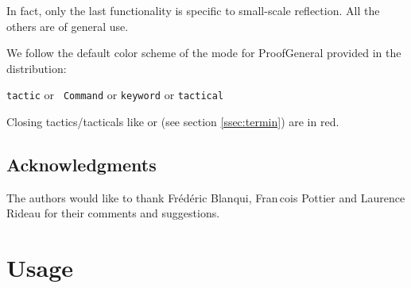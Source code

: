 In fact, only the last functionality is specific to small-scale
reflection. All the others are of general use.

\iffalse
\subsection*{How to read this documentation}

The syntax of the tactics is presented as follows:
\begin{itemize}
\item \ssrC{terminals} are in typewriter font and \ssrN{non terminals} are
  between angle brackets.
\item Optional parts of the grammar are surrounded by \optional{ }
  brackets. These should not be confused with verbatim brackets
  \ssrC{[ ]}, which are delimiters in the \ssr{} syntax.
\item A vertical rule {\optsep} indicates an alternative in the syntax, and
  should not be confused with a
  verbatim vertical rule between verbatim brackets \ssrC{[ | ]}.
\item A non empty list of non terminals (at least one item should be
  present) is represented by \ssrN{non terminals}$^+$. A possibly empty
  one is represented by \ssrN{non terminals}$^*$.
\item In a non empty list of non terminals, items are separated by blanks.
\end{itemize}
\fi

\ifhevea \else
\noindent We follow the default color scheme of the \ssr{} mode for
ProofGeneral provided in the distribution:

\centerline{
\textcolor{dkblue}{\texttt{tactic}} or \textcolor{dkviolet}{\tt
  Command} or \textcolor{dkgreen}{\tt keyword} or
\textcolor{dkpink}{\tt tactical}}

\noindent Closing tactics/tacticals like  or  (see section
\ref{ssec:termin}) are in red.
\fi

\subsection*{Acknowledgments}
The authors would like to thank Fr\'ed\'eric Blanqui, Fran\,cois Pottier
and Laurence Rideau for their comments and suggestions.

\newpage\section{Usage}

